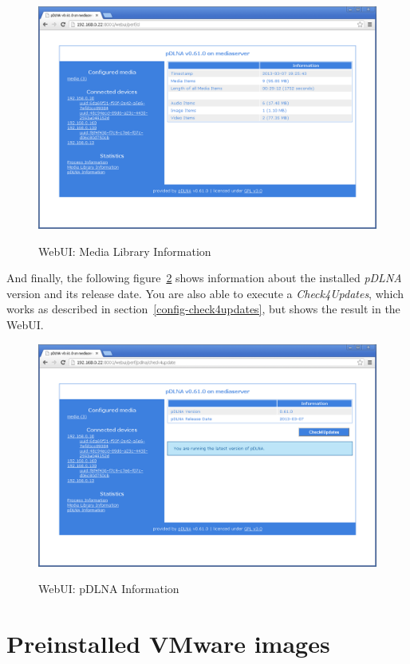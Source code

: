 \documentclass[a4paper,oneside,10pt]{report}
\begin{document}
\begin{figure}
	\centering
		\includegraphics[width=34em]{images/webui_stats_library}
	\label{fig:webgui-library}
	\caption{WebUI: Media Library Information}
\end{figure}

And finally, the following figure~\ref{fig:webgui-pdlna} shows information about the installed {\em pDLNA} version and its release date. You are also able to execute a {\em Check4Updates}, which works as described in section~\ref{config-check4updates}, but shows the result in the WebUI.

\begin{figure}
	\centering
		\includegraphics[width=34em]{images/webui_stats_pdlna}
	\label{fig:webgui-pdlna}
	\caption{WebUI: pDLNA Information}
\end{figure}

%
%

\chapter{Preinstalled VMware images}
\label{vms}
\end{document}
